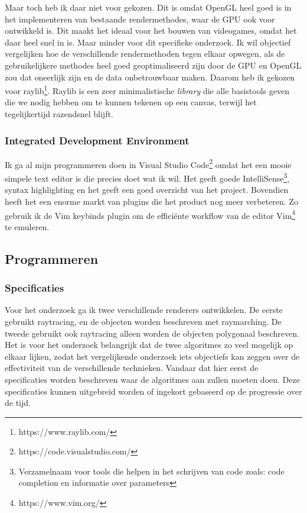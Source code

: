 \documentclass[12pt, a4paper]{article}
\begin{document}
Maar toch heb ik daar niet voor gekozen. Dit is omdat OpenGL heel goed is in het implementeren van bestaande rendermethodes, waar de GPU ook voor ontwikkeld is. Dit maakt het ideaal voor het bouwen van videogames, omdat het daar heel snel in is. Maar minder voor dit specifieke onderzoek. Ik wil objectief vergelijken hoe de verschillende rendermethoden tegen elkaar opwegen, als de gebruikelijkere methodes heel goed geoptimaliseerd zijn door de GPU en OpenGL zou dat oneerlijk zijn en de data onbetrouwbaar maken. Daarom heb ik gekozen voor raylib\footnote{https://www.raylib.com/}. Raylib is een zeer minimalistische \emph{library} die alle basistools geven die we nodig hebben om te kunnen tekenen op een canvas, terwijl het tegelijkertijd razendsnel blijft. 
\subsubsection{Integrated Development Environment}
Ik ga al mijn programmeren doen in Visual Studio Code\footnote{https://code.visualstudio.com/} omdat het een mooie simpele text editor is die precies doet wat ik wil. Het geeft goede IntelliSense\footnote{Verzamelnaam voor tools die helpen in het schrijven van code zoals: code completion en informatie over parameters}, syntax highlighting en het geeft een goed overzicht van het project. Bovendien heeft het een enorme markt van plugins die het product nog meer verbeteren. Zo gebruik ik de Vim keybinds plugin om de efficiënte workflow van de editor Vim\footnote{https://www.vim.org/} te emuleren. 
\subsection{Programmeren}
\subsubsection{Specificaties}
Voor het onderzoek ga ik twee verschillende renderers ontwikkelen. De eerste gebruikt raytracing, en de objecten worden beschreven met raymarching. De tweede gebruikt ook raytracing alleen worden de objecten polygonaal beschreven. Het is voor het onderzoek belangrijk dat de twee algoritmes zo veel mogelijk op elkaar lijken, zodat het vergelijkende onderzoek iets objectiefs kan zeggen over de effectiviteit van de verschillende technieken. Vandaar dat hier eerst de specificaties worden beschreven waar de algoritmes aan zullen moeten doen. Deze specificaties kunnen uitgebreid worden of ingekort gebaseerd op de progressie over de tijd.
\end{document}
